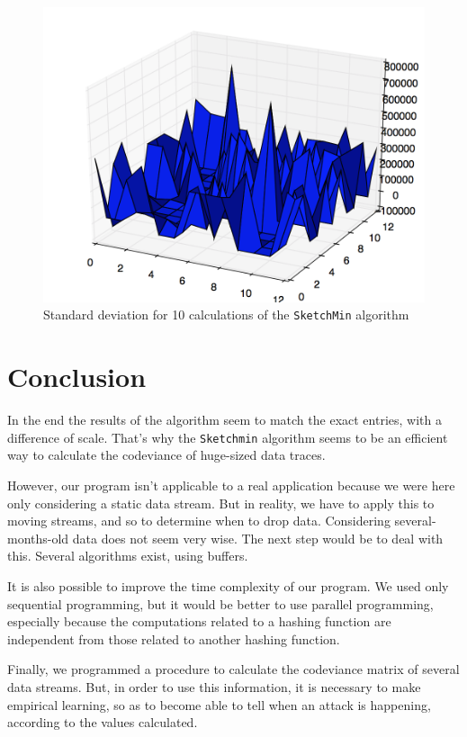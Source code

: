 \documentclass[a4paper]{article}%
\begin{document}
\begin{figure}[H]
	\center
	\includegraphics[scale=0.25]{generated10times.png}
	\caption{\footnotesize Standard deviation for 10 calculations of the \texttt{SketchMin} algorithm}
	\label{ref:exp_artificial_stdev}
\end{figure}


\section*{Conclusion}

In the end the results of the algorithm seem to match the exact entries, with a difference of scale. That's why the \texttt{Sketchmin} algorithm seems to be an efficient way to calculate the codeviance of huge-sized data traces.

However, our program isn't applicable to a real application because we were here only considering a static data stream. But in reality, we have to apply this to moving streams, and so to determine when to drop data. Considering several-months-old data does not seem very wise. The next step would be to deal with this. Several algorithms exist, using buffers.

It is also possible to improve the time complexity of our program. We used only sequential programming, but it would be better to use parallel programming, especially because the computations related to a hashing function are independent from those related to another hashing function.

Finally, we programmed a procedure to calculate the codeviance matrix of several data streams. But, in order to use this information, it is necessary to make empirical learning, so as to become able to tell when an attack is happening, according to the values calculated.
\end{document}
